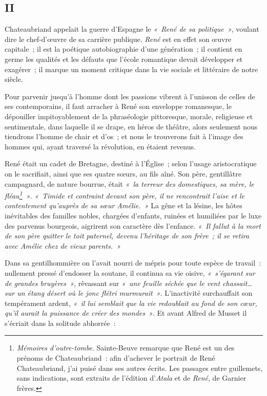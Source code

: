 \documentclass[french,twoside]{book} %
\begin{document}
\subsection[{II}]{II}
\noindent Chateaubriand appelait la guerre d’Espagne le \emph{« René de sa politique »}, voulant dire le chef-d’œuvre de sa carrière publique. \emph{René} est en effet son œuvre capitale ; il est la poétique autobiographie d’une  
\label{p580}génération ; il contient en germe les qualités et les défauts que l’école romantique devait développer et exagérer ; il marque un moment critique dans la vie sociale et littéraire de notre siècle.\par
Pour parvenir jusqu’à l’homme dont les passions vibrent à l’unisson de celles de ses contemporains, il faut arracher à René son enveloppe romanesque, le dépouiller impitoyablement de la phraséologie pittoresque, morale, religieuse et sentimentale, dans laquelle il se drape, en héros de théâtre, alors seulement nous tiendrons l’homme de chair et d’os ; et nous le trouverons fait à l’image des hommes qui, ayant traversé la révolution, en étaient revenus.\par
René était un cadet de Bretagne, destiné à l’Église ; selon l’usage aristocratique on le sacrifiait, ainsi que ses quatre sœurs, au fils aîné. Son père, gentillâtre campagnard, de nature bourrue, était \emph{« la terreur des domestiques, sa mère, le fléau\footnote{\emph{Mémoires d’outre-tombe}. Sainte-Beuve remarque que René est un des prénoms de Chateaubriand : afin d’achever le portrait de René Chateaubriand, j’ai puisé dans ses autres écrits. Les passages entre guillemets, sans indications, sont extraits de l’édition d’\emph{Atala} et de \emph{René}, de Garnier frères.} »}. \emph{« Timide et contraint devant son père, il ne rencontrait l’aise et le contentement qu’auprès de sa sœur Amélie. »} La gêne et la lésine, les hôtes inévitables des familles nobles, chargées d’enfants, ruinées et humiliées par le luxe des parvenus bourgeois, aigrirent son caractère dès l’enfance. \emph{« Il fallut à la mort de son père quitter le toit paternel, devenu l’héritage de son frère ; il se retira avec Amélie chez de vieux parents. »}\par
Dans sa gentilhommière on l’avait nourri de mépris pour toute espèce de travail : nullement pressé d’endosser la soutane, il continua sa vie oisive, \emph{« s’égarant sur de grandes bruyères »}, rêvassant sur \emph{« une feuille séchée que le vent chassait… sur un étang désert où le jonc flétri murmurait »}. L’inactivité surchauffait son tempérament ardent, \emph{« il lui semblait que la vie redoublait au fond de son cœur, qu’il aurait la puissance de créer des mondes »}. Et avant Alfred de Musset il s’écriait dans la solitude abhorrée :\par
\end{document}
